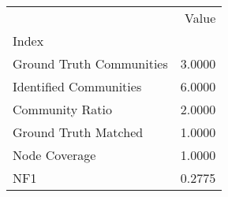 \begin{tabular}{lr}
\toprule
{} &   Value \\
Index                    &         \\
\midrule
Ground Truth Communities &  3.0000 \\
Identified Communities   &  6.0000 \\
Community Ratio          &  2.0000 \\
Ground Truth Matched     &  1.0000 \\
Node Coverage            &  1.0000 \\
NF1                      &  0.2775 \\
\bottomrule
\end{tabular}
